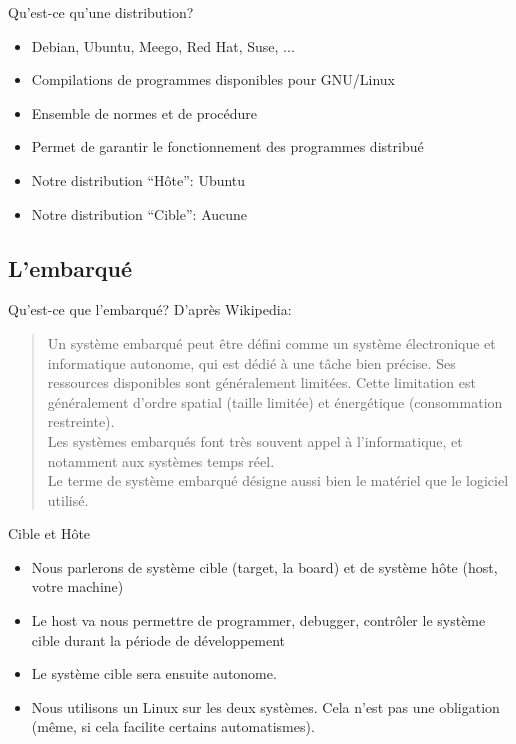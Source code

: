 \begin{frame}{Qu'est-ce qu'une distribution?}
  \begin{itemize}
  \item Debian, Ubuntu, Meego,  Red Hat, Suse, ... 
  \item Compilations de programmes disponibles pour GNU/Linux
  \item Ensemble de normes et de procédure
  \item Permet de garantir le fonctionnement des programmes distribué
  \item Notre distribution ``Hôte'': Ubuntu %
  \item Notre distribution ``Cible'': Aucune
  \end{itemize}
\end{frame}

\subsection{L'embarqué}

\begin{frame}{Qu'est-ce que l'embarqué?}
  D'après Wikipedia:
  \begin{quote}
    \justify  Un système embarqué  peut être  défini comme  un système
    électronique et  informatique autonome, qui est dédié  à une tâche
    bien  précise.   Ses   ressources  disponibles  sont  généralement
    limitées.   Cette  limitation  est  généralement  d'ordre  spatial
    (taille limitée) et énergétique (consommation restreinte).
    \\[2ex]
    Les systèmes  embarqués font très souvent  appel à l'informatique,
    et notamment aux systèmes temps réel.
    \\[2ex]
    Le terme de système embarqué désigne aussi bien le matériel que le
    logiciel utilisé.
  \end{quote}
\end{frame}

\begin{frame}{Cible et Hôte}
  \begin{itemize}
  \item  Nous parlerons  de système  cible  (target, la  board) et  de
    système hôte (host, votre machine)
  \item Le  host va nous permettre de  programmer, debugger, contrôler
    le système cible durant la période de développement
  \item Le système cible sera ensuite autonome.
  \item Nous utilisons un Linux sur les deux systèmes. Cela  n'est pas
    une obligation (même, si cela facilite certains automatismes).
  \end{itemize}
\end{frame}

